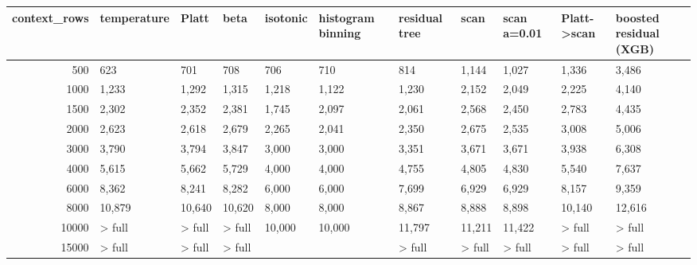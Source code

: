 \begin{tabular}{rllllllllll}
\toprule
context_rows & temperature & Platt & beta & isotonic & histogram binning & residual tree & scan & scan a=0.01 & Platt->scan & boosted residual (XGB) \\
\midrule
500 & 623 & 701 & 708 & 706 & 710 & 814 & 1,144 & 1,027 & 1,336 & 3,486 \\
1000 & 1,233 & 1,292 & 1,315 & 1,218 & 1,122 & 1,230 & 2,152 & 2,049 & 2,225 & 4,140 \\
1500 & 2,302 & 2,352 & 2,381 & 1,745 & 2,097 & 2,061 & 2,568 & 2,450 & 2,783 & 4,435 \\
2000 & 2,623 & 2,618 & 2,679 & 2,265 & 2,041 & 2,350 & 2,675 & 2,535 & 3,008 & 5,006 \\
3000 & 3,790 & 3,794 & 3,847 & 3,000 & 3,000 & 3,351 & 3,671 & 3,671 & 3,938 & 6,308 \\
4000 & 5,615 & 5,662 & 5,729 & 4,000 & 4,000 & 4,755 & 4,805 & 4,830 & 5,540 & 7,637 \\
6000 & 8,362 & 8,241 & 8,282 & 6,000 & 6,000 & 7,699 & 6,929 & 6,929 & 8,157 & 9,359 \\
8000 & 10,879 & 10,640 & 10,620 & 8,000 & 8,000 & 8,867 & 8,888 & 8,898 & 10,140 & 12,616 \\
10000 & > full & > full & > full & 10,000 & 10,000 & 11,797 & 11,211 & 11,422 & > full & > full \\
15000 & > full & > full & > full &  &  & > full & > full & > full & > full & > full \\
\bottomrule
\end{tabular}
